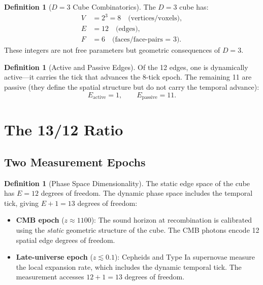 \documentclass[12pt,a4paper]{article}
\theoremstyle{definition}
\newtheorem{definition}[theorem]{Definition}
\theoremstyle{remark}
\begin{document}
\begin{definition}[$D = 3$ Cube Combinatorics]
\label{def:cube}
The $D = 3$ cube has:
\begin{align}
  V &= 2^3 = 8 \quad \text{(vertices/voxels)}, \\
  E &= 12 \quad \text{(edges)}, \\
  F &= 6 \quad \text{(faces/face-pairs = 3)}.
\end{align}
These integers are not free parameters but geometric
consequences of $D = 3$.
\end{definition}

\begin{definition}[Active and Passive Edges]
\label{def:edges}
Of the 12 edges, one is dynamically active---it carries the
tick that advances the 8-tick epoch.  The remaining 11 are
passive (they define the spatial structure but do not carry
the temporal advance):
\begin{equation}
  E_{\mathrm{active}} = 1, \qquad
  E_{\mathrm{passive}} = 11.
\end{equation}
\end{definition}

\section{The 13/12 Ratio}
\label{sec:ratio}

\subsection{Two Measurement Epochs}

\begin{definition}[Phase Space Dimensionality]
\label{def:phase-space}
The static edge space of the cube has $E = 12$ degrees of
freedom.  The dynamic phase space includes the temporal
tick, giving $E + 1 = 13$ degrees of freedom:
\begin{itemize}
  \item \textbf{CMB epoch} ($z \approx 1100$): The sound
  horizon at recombination is calibrated using the
  \emph{static} geometric structure of the cube.  The CMB
  photons encode 12 spatial edge degrees of freedom.
  \item \textbf{Late-universe epoch} ($z \lesssim 0.1$):
  Cepheids and Type Ia supernovae measure the local
  expansion rate, which includes the dynamic temporal tick.
  The measurement accesses $12 + 1 = 13$ degrees of freedom.
\end{itemize}
\end{definition}
\end{document}
